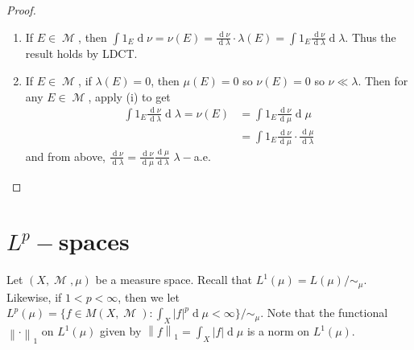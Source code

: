 \documentclass[12pt, a4paper]{memoir}
\newcommand{\norm}[1]{\ensuremath{\left\lVert#1\right\rVert}} %
\theoremstyle{nonumberplain}
\newtheorem{proof}{Proof}
\DeclareMathOperator{\M}{\mathcal{M}}
\renewcommand{\d}[1]{\ensuremath{\operatorname{d}\!{#1}}} %
\begin{document}
\begin{proof}
    \begin{enumerate}[label=(roman*)]
        \item If $E\in\M$, then $\int 1_E\d{\nu}=\nu(E)=\frac{\d{\nu}}{\d{\lambda}}\cdot\lambda(E)=\int 1_E\frac{\d{\nu}}{\d{\lambda}}\d{\lambda}$.
            Thus the result holds by LDCT.
        \item If $E\in\M$, if $\lambda(E)=0$, then $\mu(E)=0$ so $\nu(E)=0$ so $\nu\ll\lambda$.
            Then for any $E\in\M$, apply (i) to get
            \begin{align*}
                \int 1_E\frac{\d{\nu}}{\d{\lambda}}\d{\lambda} = \nu(E) &= \int 1_E\frac{\d{\nu}}{\d{\mu}}\d{\mu}\\
                                                                        &= \int 1_E\frac{\d{\nu}}{\d{\mu}}\cdot\frac{\d{\mu}}{\d{\lambda}}
            \end{align*}
            and from above, $\frac{\d{\nu}}{\d{\lambda}}=\frac{\d{\nu}}{\d{\mu}}\frac{\d{\mu}}{\d{\lambda}}$ $\lambda-$a.e.
    \end{enumerate}
\end{proof}
\section{\texorpdfstring{$L^p-$}{Lp-}spaces}
Let $(X,\M,\mu)$ be a measure space.
Recall that $L^1(\mu)=L(\mu)/\sim_\mu$.
Likewise, if $1<p<\infty$, then we let $L^p(\mu)=\{f\in M(X,\M):\int_X|f|^p\d{\mu}<\infty\}/\sim_\mu$.
Note that the functional $\norm{\cdot}_1$ on $L^1(\mu)$ given by $\norm{f}_1=\int_X|f|\d{\mu}$ is a norm on $L^1(\mu)$.
\end{document}

